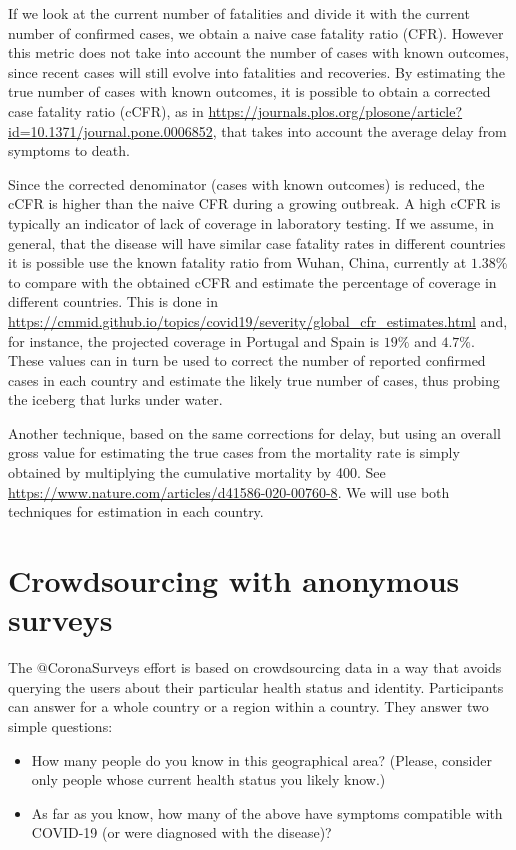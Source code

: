\documentclass{article}
\begin{document}
If we look at the current number of fatalities and divide it with the current number of confirmed cases, we obtain a naive case fatality ratio (CFR). However this metric does not take into account the number of cases with known outcomes, since recent cases will still evolve into fatalities and recoveries. By estimating the true number of cases with known outcomes, it is possible to obtain a corrected case fatality ratio (cCFR), as in \url{https://journals.plos.org/plosone/article?id=10.1371/journal.pone.0006852}, that takes into account the average delay from symptoms to death.  

Since the corrected denominator (cases with known outcomes) is reduced, the cCFR is higher than the naive CFR during a growing outbreak. A high cCFR is typically an indicator of lack of coverage in laboratory testing. If we assume, in general, that the disease will have similar case fatality rates in different countries it is possible use the known fatality ratio from Wuhan, China, currently at $1.38\%$
to compare with the obtained cCFR and estimate the percentage of coverage in different countries. This is done in \url{https://cmmid.github.io/topics/covid19/severity/global_cfr_estimates.html} and, for instance, the projected coverage in Portugal and Spain is $19\%$ and $4.7\%$. These values can in turn be used to correct the number of reported confirmed cases in each country and estimate the likely true number of cases, thus probing the iceberg that lurks under water.

Another technique, based on the same corrections for delay, but using an overall gross value for estimating the true cases from the mortality rate is simply obtained by multiplying the cumulative mortality by 400. See \url{https://www.nature.com/articles/d41586-020-00760-8}. We will use both techniques for estimation in each country.

\section{Crowdsourcing with anonymous surveys}

The $@$CoronaSurveys effort is based on crowdsourcing data in a way that avoids querying the users about their particular health status and identity. Participants can answer for a whole country or a region within a country. They answer two simple questions: 

\begin{itemize}
\item How many people do you know in this geographical area? (Please, consider only people whose current health status you likely know.)
\item As far as you know, how many of the above have symptoms compatible with COVID-19 (or were diagnosed with the disease)?
\end{itemize}
\end{document}

